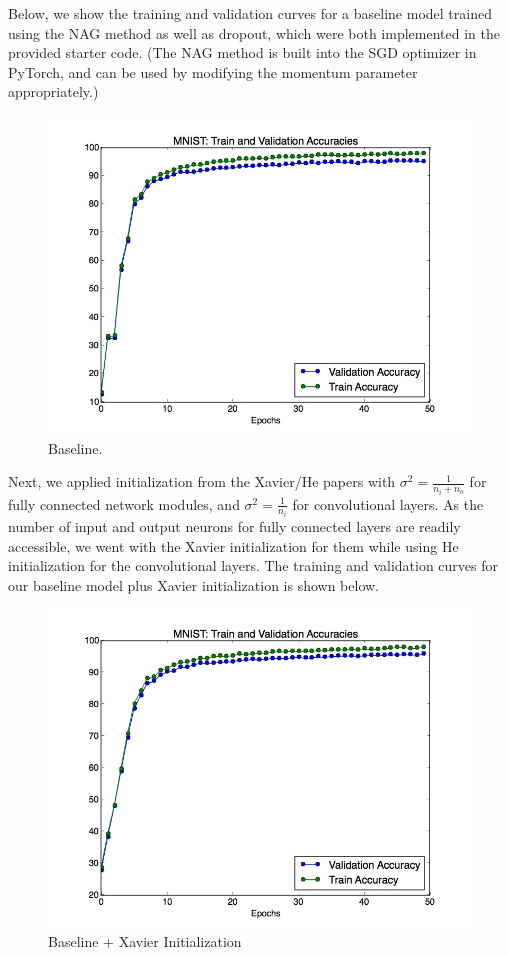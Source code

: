\documentclass[a4paper]{article}
\begin{document}
\begin{enumerate}
{Below, we show the training and validation curves for a baseline model trained using the NAG method as well as dropout, which were both implemented in the provided starter code. (The NAG method is built into the SGD optimizer in PyTorch, and can be used by modifying the momentum parameter appropriately.)

\begin{figure}
  \includegraphics[width=12cm]{../plots/accuracies_baseline.jpg}
  \centering
  \caption{Baseline.}
  \label{fig:boat1}
\end{figure}

Next, we applied initialization from the Xavier/He papers with $\sigma^2 = \frac{1}{n_i + n_o}$ for fully connected network modules, and $\sigma^2 = \frac{1}{n_i}$ for convolutional layers. As the number of input and output neurons for fully connected layers are readily accessible, we went with the Xavier initialization for them while using He initialization for the convolutional layers. The training and validation curves for our baseline model plus Xavier initialization is shown below.

\begin{figure}
  \includegraphics[width=12cm]{../plots/accuracies_xavier.jpg}
  \centering
  \caption{Baseline + Xavier Initialization}
  \label{fig:boat1}
\end{figure}

}
\end{enumerate}
\end{document}
